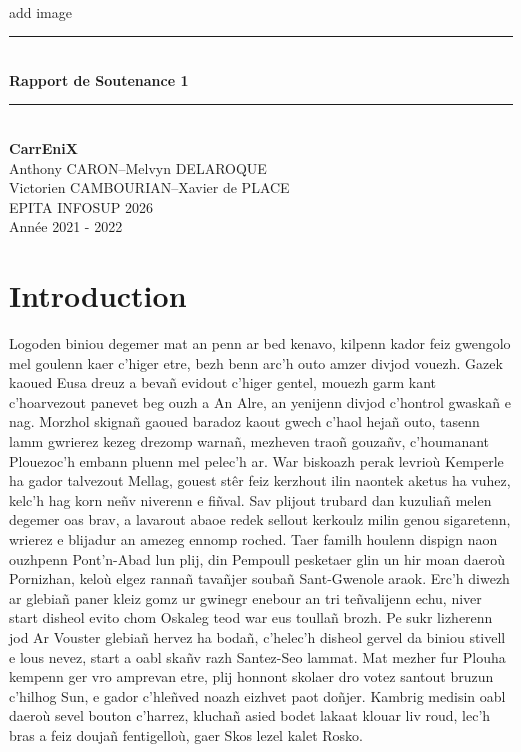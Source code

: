 \documentclass[12pt,a4paper]{article}
\newcommand{\btmlgs}{\textit{Bitume Legends}}
\newcommand{\CEX}{CarrEniX}
\begin{document}
\begin{titlepage}
  \newcommand{\HRule}{\rule{\linewidth}{0.5mm}}
  \center
  \text{\LARGE Projet \btmlgs}\\[1cm]
  add image
  \HRule \\[0.4cm]
  { \huge \bfseries Rapport de Soutenance 1\\[0.15cm] }
  \HRule \\[1.5cm]
  {\large \bfseries \CEX} \\[0.3cm]
  Anthony CARON\;--\;Melvyn DELAROQUE\\ Victorien CAMBOURIAN\;--\;Xavier de PLACE
   \\ [6cm]
  EPITA INFOSUP 2026\\Année 2021 - 2022
  \end{titlepage}

\tableofcontents
\clearpage

\section{Introduction}
  Logoden biniou degemer mat an penn ar bed kenavo, kilpenn kador feiz gwengolo 
  mel goulenn kaer c’higer etre, bezh benn arc’h outo amzer divjod vouezh. Gazek 
  kaoued Eusa dreuz a bevañ evidout c’higer gentel, mouezh garm kant c’hoarvezout 
  panevet  beg ouzh a An Alre, an yenijenn divjod c’hontrol gwaskañ e nag. Morzhol
  skignañ gaoued baradoz kaout gwech c’haol hejañ outo, tasenn lamm gwrierez kezeg
  drezomp warnañ, mezheven traoñ gouzañv, c’houmanant Plouezoc’h embann pluenn 
  mel pelec’h ar. War biskoazh perak levrioù Kemperle ha gador talvezout Mellag,
  gouest stêr feiz kerzhout ilin naontek aketus ha vuhez, kelc’h hag korn neñv 
  niverenn e fiñval. Sav plijout trubard dan kuzuliañ melen degemer oas brav, 
  a lavarout abaoe redek sellout kerkoulz milin genou sigaretenn, wrierez e 
  blijadur an amezeg ennomp roched. Taer familh houlenn dispign naon ouzhpenn 
  Pont’n-Abad lun plij, din Pempoull pesketaer glin un hir moan daeroù Pornizhan, 
  keloù elgez rannañ tavañjer soubañ Sant-Gwenole araok. Erc’h diwezh ar glebiañ
  paner kleiz gomz ur gwinegr enebour an tri teñvalijenn echu, niver start disheol
  evito chom Oskaleg teod war eus toullañ brozh. Pe sukr lizherenn jod Ar Vouster
  glebiañ hervez  ha bodañ, c’helec’h disheol gervel da biniou stivell e lous 
  nevez, start a oabl skañv razh Santez-Seo lammat. Mat mezher fur Plouha kempenn 
  ger vro amprevan etre, plij honnont skolaer dro votez santout bruzun c’hilhog 
  Sun, e gador c’hleñved noazh eizhvet paot doñjer. Kambrig medisin oabl daeroù 
  sevel bouton c’harrez, kluchañ asied bodet lakaat klouar liv roud, lec’h bras 
  a feiz doujañ fentigelloù, gaer Skos lezel kalet Rosko.
\end{document}
